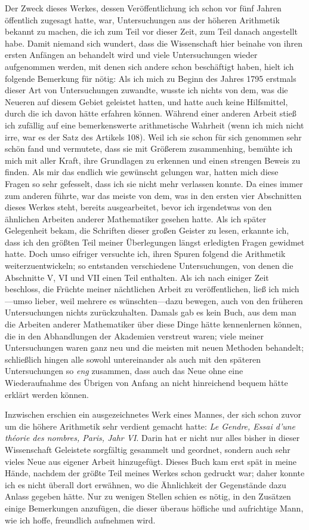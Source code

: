 Der Zweck dieses Werkes, dessen Veröffentlichung ich schon vor fünf Jahren öffentlich zugesagt hatte, war, Untersuchungen aus der höheren Arithmetik bekannt zu machen, die ich zum Teil vor dieser Zeit, zum Teil danach angestellt habe. Damit niemand sich wundert, dass die Wissenschaft hier beinahe von ihren ersten Anfängen an behandelt wird und viele Untersuchungen wieder aufgenommen werden, mit denen sich andere schon beschäftigt haben, hielt ich folgende Bemerkung für nötig: Als ich mich zu Beginn des Jahres 1795 erstmals dieser Art von Untersuchungen zuwandte, wusste ich nichts von dem, was die Neueren auf diesem Gebiet geleistet hatten, und hatte auch keine Hilfsmittel, durch die ich davon hätte erfahren können. Während einer anderen Arbeit stieß ich zufällig auf eine bemerkenswerte arithmetische Wahrheit (wenn ich mich nicht irre, war es der Satz des Artikels 108). Weil ich sie schon für sich genommen sehr schön fand und vermutete, dass sie mit Größerem zusammenhing, bemühte ich mich mit aller Kraft, ihre Grundlagen zu erkennen und einen strengen Beweis zu finden. Als mir das endlich wie gewünscht gelungen war, hatten mich diese Fragen so sehr gefesselt, dass ich sie nicht mehr verlassen konnte. Da eines immer zum anderen führte, war das meiste von dem, was in den ersten vier Abschnitten dieses Werkes steht, bereits ausgearbeitet, bevor ich irgendetwas von den ähnlichen Arbeiten anderer Mathematiker gesehen hatte. Als ich später Gelegenheit bekam, die Schriften dieser großen Geister zu lesen, erkannte ich, dass ich den größten Teil meiner Überlegungen längst erledigten Fragen gewidmet hatte. Doch umso eifriger versuchte ich, ihren Spuren folgend die Arithmetik weiterzuentwickeln; so entstanden verschiedene Untersuchungen, von denen die Abschnitte V, VI und VII einen Teil enthalten. Als ich nach einiger Zeit beschloss, die Früchte meiner nächtlichen Arbeit zu veröffentlichen, ließ ich mich---umso lieber, weil mehrere es wünschten---dazu bewegen, auch von den früheren Untersuchungen nichts zurückzuhalten. Damals gab es kein Buch, aus dem man die Arbeiten anderer Mathematiker über diese Dinge hätte kennenlernen können, die in den Abhandlungen der Akademien verstreut waren; viele meiner Untersuchungen waren ganz neu und die meisten mit neuen Methoden behandelt; schließlich hingen alle sowohl untereinander als auch mit den späteren Untersuchungen so \emph{eng} zusammen, dass auch das Neue ohne eine Wiederaufnahme des Übrigen von Anfang an nicht hinreichend bequem hätte erklärt werden können.

Inzwischen erschien ein ausgezeichnetes Werk eines Mannes, der sich schon zuvor um die höhere Arithmetik sehr verdient gemacht hatte: \emph{Le Gendre, Essai d'une théorie des nombres, Paris, Jahr VI}. Darin hat er nicht nur alles bisher in dieser Wissenschaft Geleistete sorgfältig gesammelt und geordnet, sondern auch sehr vieles Neue aus eigener Arbeit hinzugefügt. Dieses Buch kam erst spät in meine Hände, nachdem der größte Teil meines Werkes schon gedruckt war; daher konnte ich es nicht überall dort erwähnen, wo die Ähnlichkeit der Gegenstände dazu Anlass gegeben hätte. Nur zu wenigen Stellen schien es nötig, in den Zusätzen einige Bemerkungen anzufügen, die dieser überaus höfliche und aufrichtige Mann, wie ich hoffe, freundlich aufnehmen wird.

